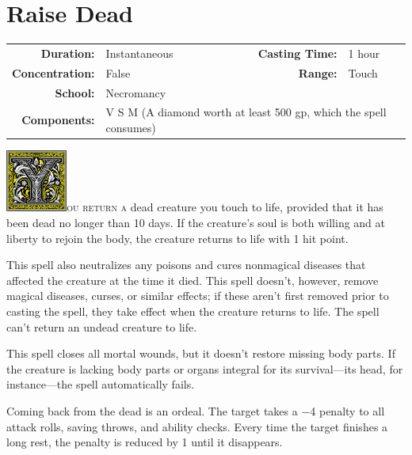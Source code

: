 \documentclass[12pt,showtrims]{memoir}
\begin{document}
\newpage
{}
\newpage
\section*{Raise Dead}
{
\small\centering\vspace{-6pt}
\begin{tabular}{rlrl}
\toprule

\textbf{Duration:} & Instantaneous  &
\textbf{Casting Time:} & 1 hour \\
\textbf{Concentration:} & False &
\textbf{Range:} & Touch \\
\textbf{School:} & Necromancy \\
\textbf{Components:} & \multicolumn{3}{p{0.7\textwidth}}{V S M (A diamond worth at least 500 gp, which the spell consumes)}\\

\bottomrule
\end{tabular}
}

\vspace{1\baselineskip}\noindent
\lettrine[lines=4]{\includegraphics[height=58pt]{initials/Y.png}}{ou return a} dead creature you touch to life, provided that it has been dead no longer than 10 days. If the creature’s soul is both willing and at liberty to rejoin the body, the creature returns to life with 1 hit point.

This spell also neutralizes any poisons and cures nonmagical diseases that affected the creature at the time it died. This spell doesn’t, however, remove magical diseases, curses, or similar effects; if these aren’t first removed prior to casting the spell, they take effect when the creature returns to life. The spell can’t return an undead creature to life.

This spell closes all mortal wounds, but it doesn’t restore missing body parts. If the creature is lacking body parts or organs integral for its survival—its head, for instance—the spell automatically fails.

Coming back from the dead is an ordeal. The target takes a −4 penalty to all attack rolls, saving throws, and ability checks. Every time the target finishes a long rest, the penalty is reduced by 1 until it disappears.
\end{document}
